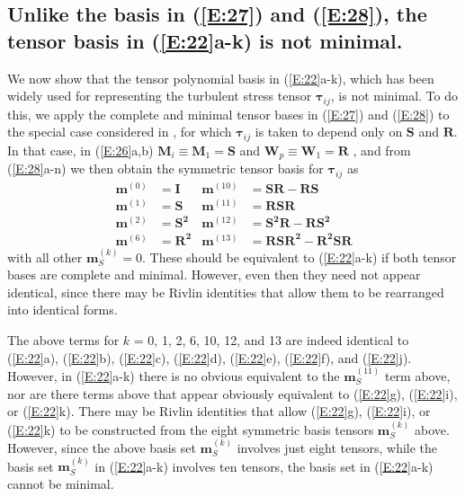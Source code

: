 \subsection{Unlike the basis in (\ref{E:27}) and (\ref{E:28}), the tensor basis in (\ref{E:22}a-k) is not minimal.}
\label{sec:2B}

We now show that the tensor polynomial basis in (\ref{E:22}a-k), which has been widely used for representing the turbulent stress tensor $\mathbf{\tau}_{ij}$, is not minimal. To do this, we apply the complete and minimal tensor bases in (\ref{E:27}) and (\ref{E:28}) to the special case considered in , for which $\mathbf{\tau}_{ij}$ is taken to depend only on $\mathbf{S}$ and $\mathbf{R}$.  In that case, in (\ref{E:26}a,b) $\mathbf{M}_i \equiv \mathbf{M}_1 = \mathbf{S}$ and $\mathbf{W}_p \equiv \mathbf{W}_1 = \mathbf{R}$ , and from (\ref{E:28}a-n) we then obtain the symmetric tensor basis for  $\mathbf{\tau}_{ij}$ as
%
\begin{align*}
	\mathbf{m}^{(0)} &= \mathbf{I}    &  \mathbf{m}^{(10)}  &= \mathbf{SR}-\mathbf{RS}  \\ 
	\mathbf{m}^{(1)} &= \mathbf{S}    &  \mathbf{m}^{(11)}  &= \mathbf{RSR} \\
	\mathbf{m}^{(2)} &= \mathbf{S^2}  &  \mathbf{m}^{(12)}  &= \mathbf{S^2R}-\mathbf{RS^2}  \\
	\mathbf{m}^{(6)} &= \mathbf{R^2}  &  \mathbf{m}^{(13)}  &= \mathbf{RSR^2}-\mathbf{R^2SR} 
\end{align*}
%
%   	 
with all other $\mathbf{m}^{(k)}_S= 0$. These should be equivalent to (\ref{E:22}a-k) if both tensor bases are complete and minimal.  However, even then they need not appear identical, since there may be Rivlin identities that allow them to be rearranged into identical forms.

The above terms for $k$ = 0, 1, 2, 6, 10, 12, and 13 are indeed identical to (\ref{E:22}a), (\ref{E:22}b), (\ref{E:22}c), (\ref{E:22}d), (\ref{E:22}e), (\ref{E:22}f), and (\ref{E:22}j). However, in (\ref{E:22}a-k) there is no obvious equivalent to the $\mathbf{m}^{(11)}_S$  term above, nor are there terms above that appear obviously equivalent to (\ref{E:22}g), (\ref{E:22}i), or (\ref{E:22}k). There may be Rivlin identities that allow (\ref{E:22}g), (\ref{E:22}i), or (\ref{E:22}k) to be constructed from the eight symmetric basis tensors  $\mathbf{m}^{(k)}_S$ above. However, since the above basis set $\mathbf{m}^{(k)}_S$ involves just eight tensors, while the basis set  $\mathbf{m}^{(k)}_S$  in (\ref{E:22}a-k) involves ten tensors, the basis set in (\ref{E:22}a-k) cannot be minimal.

